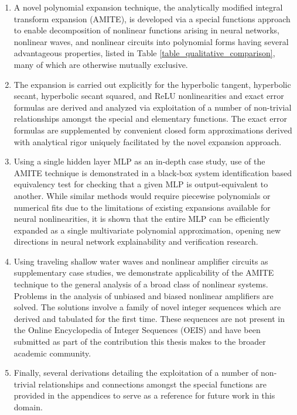\begin{enumerate}
	\item A novel polynomial expansion technique, the analytically modified integral transform expansion (AMITE), is developed via a special functions approach to enable decomposition of nonlinear functions arising in neural networks, nonlinear waves, and nonlinear circuits into polynomial forms having several advantageous properties, listed in Table \ref{table_qualitative_comparison}, many of which are otherwise mutually exclusive.
	
	\item The expansion is carried out explicitly for the hyperbolic tangent, hyperbolic secant, hyperbolic secant squared, and ReLU nonlinearities and exact error formulas are derived and analyzed via exploitation of a number of non-trivial relationships amongst the special and elementary functions.  The exact error formulas are supplemented by convenient closed form approximations derived with analytical rigor uniquely facilitated by the novel expansion approach. 
	
	\item Using a single hidden layer MLP as an in-depth case study, use of the AMITE technique is demonstrated in a black-box system identification based equivalency test for checking that a given MLP is output-equivalent to another.  While similar methods would require piecewise polynomials or numerical fits due to the limitations of existing expansions available for neural nonlinearities, it is shown that the entire MLP can be efficiently expanded as a single multivariate polynomial approximation, opening new directions in neural network explainability and verification research. \label{list_item_mlp_case_study}
	
	\item Using traveling shallow water waves and nonlinear amplifier circuits as supplementary case studies, we demonstrate applicability of the AMITE technique to the general analysis of a broad class of nonlinear systems.  Problems in the analysis of unbiased and biased nonlinear amplifiers are solved.  The solutions involve a family of novel integer sequences which are derived and tabulated for the first time.  These sequences are not present in the Online Encyclopedia of Integer Sequences (OEIS) and have been submitted as part of the contribution this thesis makes to the broader academic community. \label{list_item_extra_case_study}
	
	\item Finally, several derivations detailing the exploitation of a number of non-trivial relationships and connections amongst the special functions are provided in the appendices to serve as a reference for future work in this domain.
	
\end{enumerate}

